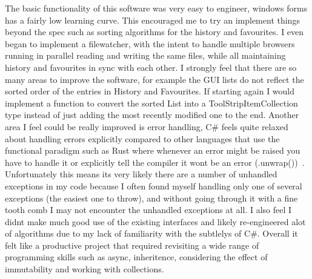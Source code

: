 \documentclass[../Main.tex]{subfiles}
\begin{document}
The basic functionality of this software was very easy to engineer, windows forms has a fairly low learning curve. 
This encouraged me to try an implement things beyond the spec such as sorting algorithms for the history and favourites.
I even began to implement a filewatcher, with the intent to handle multiple browsers running in parallel reading and writing the same files, while all maintaining history and favourites in sync with each other. 
I strongly feel that there are so many areas to improve the software, for example the GUI lists do not reflect the sorted order of the entries in History and Favourites. 
If starting again I would implement a function to convert the sorted List into a ToolStripItemCollection type instead of just adding the most recently modified one to the end.
Another area I feel could be really improved is error handling, C\# feels quite relaxed about handling errors explicitly compared to other languages that use the functional paradigm such as Rust where whenever an error might be raised you have to handle it or explicitly tell the compiler it wont be an error (.unwrap())~\autocite{StdResultResult}. 
Unfortunately this means its very likely there are a number of unhandled exceptions in my code because I often found myself handling only one of several exceptions (the easiest one to throw), and without going through it with a fine tooth comb I may not encounter the unhandled exceptions at all. I also feel I didnt make much good use of the existing interfaces and likely re-engineered alot of algorithms due to my lack of familiarity with the subtlelys of C\#. Overall it felt like a productive project that required revisiting a wide range of programming skills such as async, inheritence, considering the effect of immutability and working with collections.
\end{document}
